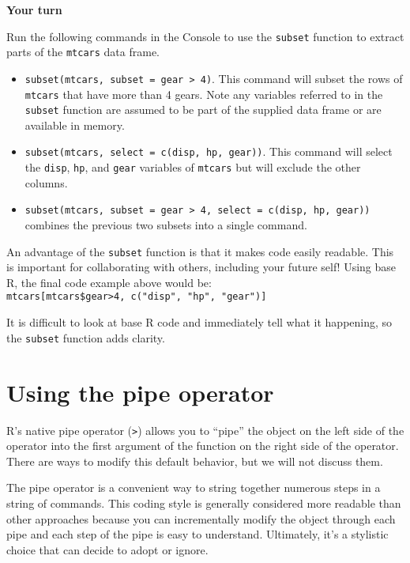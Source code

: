 \documentclass[
]{book}
\providecommand{\tightlist}{%
  \setlength{\itemsep}{0pt}\setlength{\parskip}{0pt}}
\theoremstyle{definition}
\theoremstyle{definition}
\theoremstyle{definition}
\theoremstyle{definition}
\theoremstyle{remark}
\begin{document}
\begin{yourturn}

\textbf{Your turn}

Run the following commands in the Console to use the \texttt{subset} function to extract parts of the \texttt{mtcars} data frame.

\begin{itemize}
\tightlist
\item
  \texttt{subset(mtcars,\ subset\ =\ gear\ \textgreater{}\ 4)}. This command will subset the rows of \texttt{mtcars} that have more than 4 gears. Note any variables referred to in the \texttt{subset} function are assumed to be part of the supplied data frame or are available in memory.
\item
  \texttt{subset(mtcars,\ select\ =\ c(disp,\ hp,\ gear))}. This command will select the \texttt{disp}, \texttt{hp}, and \texttt{gear} variables of \texttt{mtcars} but will exclude the other columns.
\item
  \texttt{subset(mtcars,\ subset\ =\ gear\ \textgreater{}\ 4,\ select\ =\ c(disp,\ hp,\ gear))} combines the previous two subsets into a single command.
\end{itemize}

\end{yourturn}

An advantage of the \texttt{subset} function is that it makes code easily readable. This is important for collaborating with others, including your future self! Using base R, the final code example above would be: \texttt{mtcars{[}mtcars\$gear\textgreater{}4,\ c("disp",\ "hp",\ "gear"){]}}

It is difficult to look at base R code and immediately tell what it happening, so the \texttt{subset} function adds clarity.

\hypertarget{using-the-pipe-operator}{%
\section{Using the pipe operator}\label{using-the-pipe-operator}}

R's native pipe operator (\texttt{\textbar{}\textgreater{}}) allows you to ``pipe'' the object on the left side of the operator into the first argument of the function on the right side of the operator. There are ways to modify this default behavior, but we will not discuss them.

The pipe operator is a convenient way to string together numerous steps in a string of commands. This coding style is generally considered more readable than other approaches because you can incrementally modify the object through each pipe and each step of the pipe is easy to understand. Ultimately, it's a stylistic choice that can decide to adopt or ignore.
\end{document}
